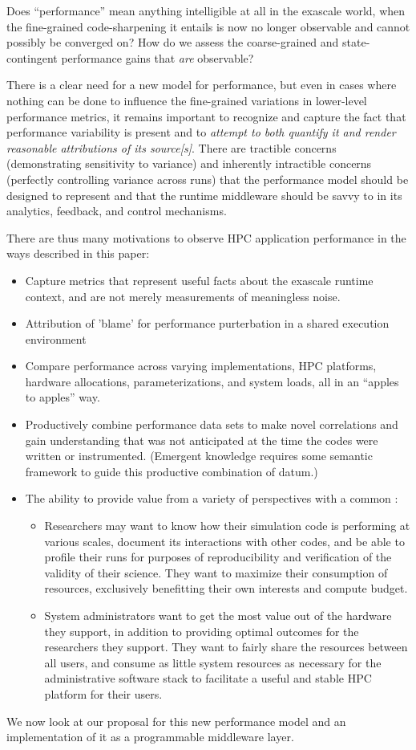 Does ``performance'' mean anything intelligible at all in the exascale
world, when the fine-grained code-sharpening it entails is now no
longer observable and cannot possibly be converged on? How do we
assess the coarse-grained and state-contingent performance gains
that \textit{are} observable?

There is a clear need for a new model for performance, but even in
cases where nothing can be done to influence the fine-grained
variations in lower-level performance metrics, it remains important to
recognize and capture the fact that performance variability is present
and to \textit{attempt to both quantify it and render reasonable
attributions of its source[s]}. There are tractible concerns
(demonstrating sensitivity to variance) and inherently intractible
concerns (perfectly controlling variance across runs) that the
performance model should be designed to represent and that the runtime
middleware should be savvy to in its analytics, feedback, and control
mechanisms.

There are thus many motivations to observe HPC application performance
in the ways described in this paper:
\begin{itemize}
\item Capture metrics that represent useful facts about the exascale
runtime context, and are not merely measurements of meaningless noise.
\item Attribution of 'blame' for performance purterbation in a shared execution environment
\item Compare performance across varying implementations, HPC platforms,
      hardware allocations, parameterizations, and system loads, all in an
      ``apples to apples'' way.
\item Productively combine performance data sets to make novel correlations
      and gain understanding that was not anticipated at the time the
      codes were written or instrumented.  (Emergent knowledge requires
      some semantic framework to guide this productive combination of
      datum.)
\item The ability to provide value from a variety of perspectives with
      a common :
  \begin{itemize} \item Researchers may want to know how their
     simulation code is performing at various scales, document its
     interactions with other codes, and be able to profile their runs
     for purposes of reproducibility and verification of the validity
     of their science.  They want to maximize their consumption of
     resources, exclusively benefitting their own interests and
     compute budget.  \item System administrators want to get the most
     value out of the hardware they support, in addition to providing
     optimal outcomes for the researchers they support. They want to
     fairly share the resources between all users, and consume as
     little system resources as necessary for the administrative
     software stack to facilitate a useful and stable HPC platform for
     their users.  \end{itemize}
\end{itemize}

We now look at our proposal for this new performance model and an
implementation of it as a programmable middleware layer.



